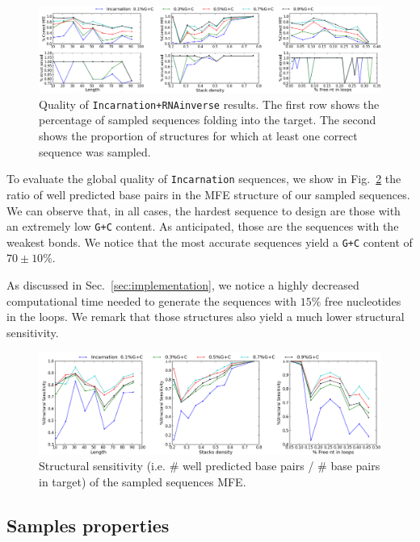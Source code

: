 \begin{figure}[ht!]	
	\centering
	\includegraphics[scale=0.45]{Figures/mfe_struct_solved}
	\caption{Quality of \texttt{Incarnation+RNAinverse} results. The first row shows the percentage
	of sampled sequences folding into the target. The second shows the 	
	proportion	of structures for which at least one correct sequence was 
	sampled.}
	\label{fig:mfe_struct_solved}	
\end{figure}
 
To evaluate the global quality of \texttt{Incarnation} sequences, we show
in Fig.~\ref{fig:ss_sens} the ratio of well predicted base pairs in the
MFE structure of our sampled sequences. We can observe that, in all cases,
the hardest sequence to design are those with an extremely low \texttt{G+C}
content. As anticipated, those are the sequences with the weakest bonds.
We notice that the most accurate sequences yield a \texttt{G+C} content
of $70\pm 10\%$. 

As discussed in Sec.~\ref{sec:implementation}, we notice a highly decreased
computational time needed to generate the sequences with $15\%$ free 
nucleotides in the loops. We remark that those structures also yield 
a much lower structural sensitivity.

\begin{figure}[ht!]
 	\centering
	\includegraphics[width=1\textwidth,height=0.16\textheight]{Figures/rnastrand_clustered_rnainverse_100samples_struct_sens.png}
	\caption{Structural sensitivity (i.e. $\#$ well predicted base pairs / $\#$ base pairs in target) of the sampled sequences MFE. }
	\label{fig:ss_sens}	
\end{figure}


\subsection{Samples properties}


